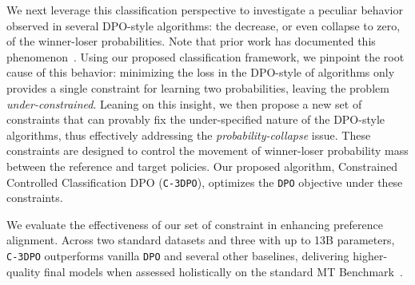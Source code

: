 We next leverage this classification perspective to investigate a peculiar behavior observed in several DPO-style algorithms: the decrease, or even collapse to zero, of the winner-loser probabilities. Note that prior work has documented this phenomenon~\cite{nemotron,ppo_vs_dpo,smaug,distilled_DPO,xiao2024caldpo,AIPO,sppo,APO}. Using our proposed classification framework, we pinpoint the root cause of this behavior: minimizing the loss in the DPO-style of algorithms only provides a single constraint for learning two probabilities, leaving the problem {\em under-constrained}. Leaning on this insight, we then propose a new set of constraints that can provably fix the under-specified nature of the DPO-style algorithms, thus effectively addressing the {\em probability-collapse} issue. These constraints are designed to control the movement of winner-loser probability mass between the reference and target policies. Our proposed algorithm, Constrained Controlled Classification DPO (\texttt{C-3DPO}), optimizes the \texttt{DPO} objective under these constraints.  

We evaluate the effectiveness of our set of constraint in enhancing preference alignment. Across two standard datasets and three with up to 13B parameters, \texttt{C-3DPO} outperforms vanilla \texttt{DPO} and several other baselines, delivering higher-quality final models when assessed holistically on the standard MT Benchmark~\cite{mt_bench}.
